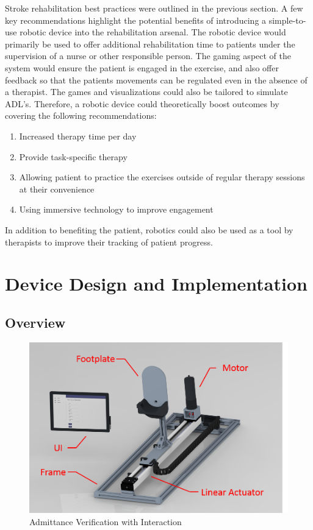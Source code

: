 \documentclass[12pt]{report}
\begin{document}
Stroke rehabilitation best practices were outlined in the previous section. A few key recommendations highlight the potential benefits of introducing a simple-to-use robotic device into the rehabilitation arsenal. The robotic device would primarily be used to offer additional rehabilitation time to patients under the supervision of a nurse or other responsible person. The gaming aspect of the system would ensure the patient is engaged in the exercise, and also offer feedback so that the patients movements can be regulated even in the absence of a therapist. The games and visualizations could also be tailored to simulate ADL's. Therefore, a robotic device could theoretically boost outcomes by covering the following recommendations:
\begin{enumerate}
	\item Increased therapy time per day 
	\item Provide task-specific therapy
	\item Allowing patient to practice the exercises outside of regular therapy sessions at their convenience 
	\item Using immersive technology to improve engagement 
\end{enumerate}
In addition to benefiting the patient, robotics could also be used as a tool by therapists to improve their tracking of patient progress. 




\chapter{Device Design and Implementation}
	\section{Overview}

	\begin{figure}[t] 
		\centering
		\includegraphics[width=0.75\linewidth]{Robot_labeled}
		\caption{Admittance Verification with Interaction}
		\label{fig:VerInt}
	\end{figure}
	
\end{document}
